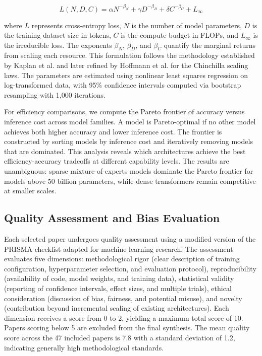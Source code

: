 \documentclass[journal]{IEEEtran}
\begin{document}
\begin{equation}
L(N, D, C) = \alpha N^{-\beta_N} + \gamma D^{-\beta_D} + \delta C^{-\beta_C} + L_{\infty}
\label{eq:scaling}
\end{equation}

where \(L\) represents cross-entropy loss, \(N\) is the number of model parameters, \(D\) is the training dataset size in tokens, \(C\) is the compute budget in FLOPs, and \(L_{\infty}\) is the irreducible loss. The exponents \(\beta_N\), \(\beta_D\), and \(\beta_C\) quantify the marginal returns from scaling each resource. This formulation follows the methodology established by Kaplan et al. \cite{r3} and later refined by Hoffmann et al. \cite{r4} for the Chinchilla scaling laws. The parameters are estimated using nonlinear least squares regression on log-transformed data, with 95\% confidence intervals computed via bootstrap resampling with 1,000 iterations.

For efficiency comparisons, we compute the Pareto frontier of accuracy versus inference cost across model families. A model is Pareto-optimal if no other model achieves both higher accuracy and lower inference cost. The frontier is constructed by sorting models by inference cost and iteratively removing models that are dominated. This analysis reveals which architectures achieve the best efficiency-accuracy tradeoffs at different capability levels. The results are unambiguous: sparse mixture-of-experts models dominate the Pareto frontier for models above 50 billion parameters, while dense transformers remain competitive at smaller scales.

\subsection{Quality Assessment and Bias Evaluation}

Each selected paper undergoes quality assessment using a modified version of the PRISMA checklist adapted for machine learning research. The assessment evaluates five dimensions: methodological rigor (clear description of training configuration, hyperparameter selection, and evaluation protocol), reproducibility (availability of code, model weights, and training data), statistical validity (reporting of confidence intervals, effect sizes, and multiple trials), ethical consideration (discussion of bias, fairness, and potential misuse), and novelty (contribution beyond incremental scaling of existing architectures). Each dimension receives a score from 0 to 2, yielding a maximum total score of 10. Papers scoring below 5 are excluded from the final synthesis. The mean quality score across the 47 included papers is 7.8 with a standard deviation of 1.2, indicating generally high methodological standards.
\end{document}
